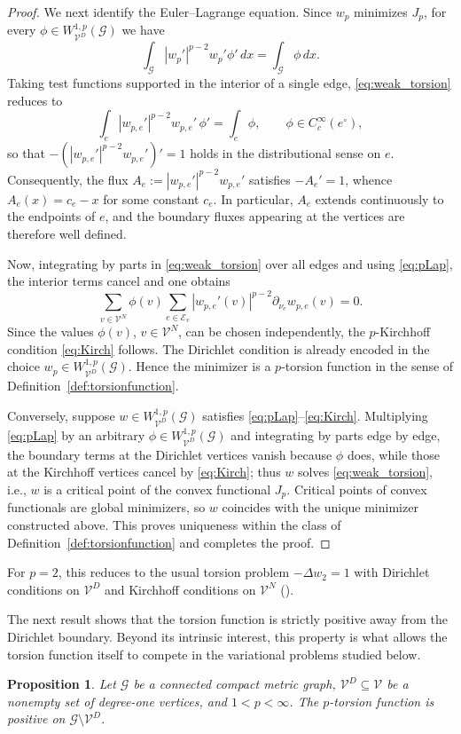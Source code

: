 \documentclass[12pt,a4paper]{article}
\numberwithin{equation}{section}
\newtheorem{proposition}[theorem]{Proposition}
\newcommand{\WpD}{W^{1,p}_{\mathcal{V}^D}(\mathcal G)}
\begin{document}
\begin{proof}
	We next identify the Euler--Lagrange equation. Since $w_p$ minimizes
	$J_p$, for every $\phi\in\WpD$ we have
	\begin{equation}\label{eq:weak_torsion}
		\int_{\mathcal G}|w_p'|^{p-2}w_p'\phi'\,dx
		=
		\int_{\mathcal G}\phi\,dx .
	\end{equation}
	Taking test functions supported in the interior of a single edge,
	\eqref{eq:weak_torsion} reduces to
	\[
	\int_e |w_{p,e}'|^{p-2}w_{p,e}'\,\phi'
	=
	\int_e\phi,
	\qquad
	\phi\in C_c^\infty(e^\circ),
	\]
	so that
	\(
	-(|w_{p,e}'|^{p-2}w_{p,e}')'=1
	\)
	holds in the distributional sense on $e$. Consequently, the flux
	\(
	A_e:=|w_{p,e}'|^{p-2}w_{p,e}'
	\)
	satisfies $-A_e'=1$, whence
	$A_e(x)=c_e-x$ for some constant $c_e$. In particular,
	$A_e$ extends continuously to the endpoints of $e$, and the boundary
	fluxes appearing at the vertices are therefore well defined.
	
	Now, integrating by parts in \eqref{eq:weak_torsion} over all edges and
	using \eqref{eq:pLap}, the interior terms cancel and one obtains
	\[
	\sum_{v\in \mathcal{V}^N}\phi(v)
	\sum_{e\in \mathcal{E}_v}
	|w_{p,e}'(v)|^{p-2}\partial_{\nu_e}w_{p,e}(v)=0 .
	\]
	Since the values $\phi(v)$, $v\in \mathcal{V}^N$, can be chosen
	independently, the $p$-Kirchhoff condition \eqref{eq:Kirch}
	follows. The Dirichlet condition is already encoded in the choice
	$w_p\in\WpD$. Hence the minimizer is a $p$-torsion function in the
	sense of Definition~\ref{def:torsionfunction}.
	
	Conversely, suppose $w\in\WpD$ satisfies
	\eqref{eq:pLap}--\eqref{eq:Kirch}. Multiplying \eqref{eq:pLap} by an
	arbitrary $\phi\in\WpD$ and integrating by parts edge by edge, the
	boundary terms at the Dirichlet vertices vanish because $\phi$ does,
	while those at the Kirchhoff vertices cancel by \eqref{eq:Kirch}; thus
	$w$ solves \eqref{eq:weak_torsion}, i.e., $w$ is a critical point of
	the convex functional $J_p$. Critical points of convex functionals are
	global minimizers, so $w$ coincides with the unique minimizer
	constructed above. This proves uniqueness within the class of
	Definition~\ref{def:torsionfunction} and completes the proof.
\end{proof}

For $p=2$, this reduces to the usual torsion problem
$-\Delta w_2=1$ with Dirichlet conditions on $\mathcal{V}^D$ and Kirchhoff conditions on
$\mathcal{V}^N$ (\cite{MuPl}).




The next result shows that the torsion function is strictly positive
away from the Dirichlet boundary. Beyond its intrinsic interest, this
property is what allows the torsion function itself to compete in the
variational problems studied below.
\begin{proposition}
	\label{prop:positivity}
	Let $\mathcal G$ be a connected compact metric graph, 
	$\mathcal{V}^D \subseteq \mathcal{V}$ be a nonempty set of degree-one vertices, and 
	$1<p<\infty$.	The $p$-torsion function is positive on
	$\mathcal G\setminus \mathcal{V}^D$.
\end{proposition}
\end{document}
